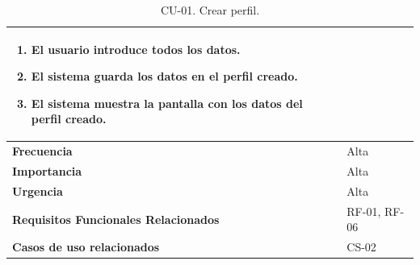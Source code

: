 \begin{table}[htbp]
\begin{tabular}{ |m{3cm}|m{11cm}|  }
\begin{enumerate}
            \item El usuario introduce todos los datos.
            \item El sistema guarda los datos en el perfil creado.
            \item El sistema muestra la pantalla con los datos del perfil creado.
        \end{enumerate}\\
\hline
\cellcolor[HTML]{EFEFEF}\textbf{Frecuencia}                & Alta\\
\hline
\cellcolor[HTML]{EFEFEF}\textbf{Importancia}                & Alta\\
\hline
\cellcolor[HTML]{EFEFEF}\textbf{Urgencia}                & Alta\\
\hline
\cellcolor[HTML]{EFEFEF}\textbf{Requisitos Funcionales Relacionados}                & { RF-01, RF-06 }\\
\hline
\cellcolor[HTML]{EFEFEF}\textbf{Casos de uso relacionados}                & { CS-02 }\\
\hline
\end{tabular}
\caption{CU-01. Crear perfil.}
\end{table}


